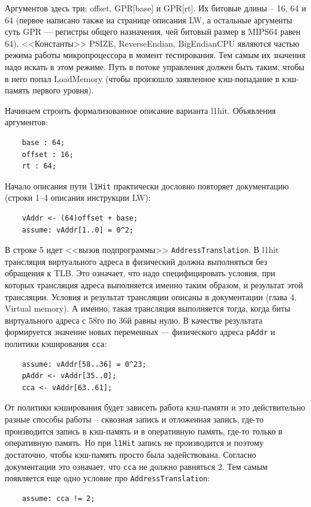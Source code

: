 Аргументов здесь три: offset, GPR[base] и GPR[rt]. Их битовые длины -- 16, 64 и
64 (первое написано также на странице описания LW, а остальные аргументы суть
GPR --- регистры общего назначения, чей битовый размер в MIPS64 равен 64).
<<Константы>> PSIZE, ReverseEndian, BigEndianCPU являются частью режима работы
микропроцессора в момент тестирования. Тем самым их значения надо искать в этом
режиме. Путь в потоке управления должен быть таким, чтобы в него попал
LoadMemory (чтобы произошло заявленное кэш-попадание в кэш-память первого
уровня).

Начинаем строить формализованное описание варианта l1hit. Объявления аргументов:
\begin{verbatim}
    base : 64;
    offset : 16;
    rt : 64;
\end{verbatim}

Начало описания пути \texttt{l1Hit} практически дословно повторяет документацию (строки 1--4 описания инструкции LW):
\begin{verbatim}
    vAddr <- (64)offset + base;
    assume: vAddr[1..0] = 0^2;
\end{verbatim}

В строке 5 идет <<вызов подпрограммы>> \texttt{AddressTranslation}. В l1hit трансляция виртуального адреса в физический должна выполняться без
обращения к TLB. Это означает, что надо специфицировать условия, при которых
трансляция адреса выполняется именно таким образом, и результат этой трансляции.
Условия и результат трансляции описаны в документации (глава 4. Virtual memory). А именно, такая
трансляция выполняется тогда, когда биты виртуального адреса с 58го по 36й равны нулю. В качестве результата формируется значение новых переменных --- физического адреса \texttt{pAddr} и политики кэширования \texttt{cca}:
\begin{verbatim}
    assume: vAddr[58..36] = 0^23;
    pAddr <- vAddr[35..0];
    cca <- vAddr[63..61];
\end{verbatim}

От политики кэширования будет зависеть работа кэш-памяти и это действительно
разные способы работы -- сквозная запись и отложенная запись, где-то
производится запись в кэш-память и в оперативную память, где-то только в
оперативную память. Но при \texttt{l1Hit} запись не производится и
поэтому достаточно, чтобы кэш-память просто была задействована. Согласно
документации это означает, что \texttt{cca} не должно равняться 2. Тем самым
появляется еще одно условие про \texttt{AddressTranslation}:
\begin{verbatim}
    assume: cca != 2;
\end{verbatim}

